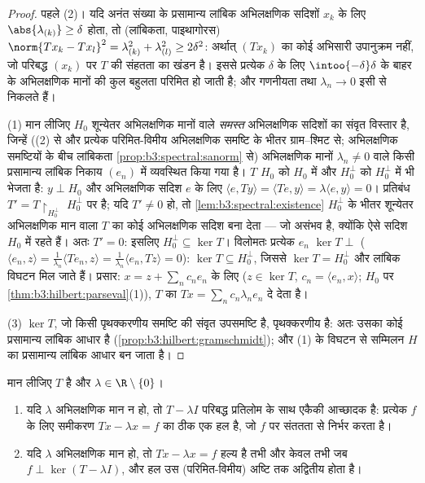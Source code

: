 \begin{proof}
पहले (2)। यदि अनंत संख्या के प्रसामान्य लांबिक अभिलक्षणिक सदिशों
$x_k$ के लिए $\abs{\lambda_{(k)}} \geq \delta$ होता, तो (लांबिकता, पाइथागोरस) $\norm{Tx_k - Tx_l}^2 =
\lambda_{(k)}^2 + \lambda_{(l)}^2 \geq 2\delta^2$: अर्थात्
$(Tx_k)$ का कोई अभिसारी उपानुक्रम नहीं, जो परिबद्ध $(x_k)$ पर $T$ की
संहतता का खंडन है। इससे प्रत्येक $\delta$ के लिए $\intoo{-\delta}\delta$ के बाहर के
अभिलक्षणिक मानों की कुल बहुलता परिमित हो जाती है; और गणनीयता तथा
$\lambda_n \to 0$ इसी से निकलते हैं।

(1) मान लीजिए $H_0$ शून्येतर अभिलक्षणिक मानों वाले \emph{समस्त}
अभिलक्षणिक सदिशों का संवृत विस्तार है, जिन्हें ((2) से और प्रत्येक
परिमित-विमीय अभिलक्षणिक समष्टि के भीतर ग्राम--श्मिट से; अभिलक्षणिक
समष्टियों के बीच लांबिकता \cref{prop:b3:spectral:sanorm} से) अभिलक्षणिक मानों $\lambda_n \neq 0$ वाले
किसी प्रसामान्य लांबिक निकाय $(e_n)$ में व्यवस्थित किया गया है।
$T$ $H_0$ को $H_0$ में और $H_0^\perp$ को $H_0^\perp$ में भी भेजता है: $y
\perp H_0$
और अभिलक्षणिक सदिश $e$ के लिए $\langle e, Ty\rangle =
\langle Te, y\rangle = \lambda\langle e, y\rangle = 0$। प्रतिबंध $T' = T\restriction_{H_0^\perp}$  $H_0^\perp$ पर   है; यदि $T' \neq
0$ हो, तो \cref{lem:b3:spectral:existence} $H_0^\perp$
के भीतर शून्येतर अभिलक्षणिक मान वाला $T$ का कोई अभिलक्षणिक सदिश
बना देता --- जो असंभव है, क्योंकि ऐसे सदिश $H_0$ में रहते हैं। अतः
$T' = 0$: इसलिए $H_0^\perp \subseteq \ker T$। विलोमतः प्रत्येक $e_n$ $\ker T \perp$ ($\langle e_n, z\rangle = \frac1{\lambda_n}\langle
Te_n, z\rangle = \frac1{\lambda_n}\langle e_n, Tz\rangle =
0$): $\ker T \subseteq H_0^\perp$,
जिससे $\ker T =
H_0^\perp$ और लांबिक विघटन मिल जाते हैं। प्रसार: $x = z + \sum_nc_ne_n$ के लिए
($z \in \ker T$, $c_n = \langle
e_n, x\rangle$; $H_0$ पर \cref{thm:b3:hilbert:parseval}(1)), $T$ का  $Tx = \sum_nc_n\lambda_ne_n$ दे देता
है।

(3) $\ker T$, जो किसी पृथक्करणीय समष्टि की संवृत उपसमष्टि है,
पृथक्करणीय है: अतः उसका कोई प्रसामान्य लांबिक आधार है (\cref{prop:b3:hilbert:gramschmidt}); और
(1) के विघटन से सम्मिलन $H$ का प्रसामान्य लांबिक आधार बन जाता है।
\end{proof}

\begin{theorem}[फ्रेडहोम विकल्प]
\label{thm:b3:spectral:fredholm}
मान लीजिए $T$   है और $\lambda \in \R\setminus
\{0\}$।
\begin{enumerate}
  \item यदि $\lambda$ अभिलक्षणिक मान न हो, तो $T - \lambda I$ परिबद्ध प्रतिलोम
        के साथ एकैकी आच्छादक है: प्रत्येक $f$ के लिए समीकरण
        $Tx - \lambda x = f$ का ठीक एक हल है, जो $f$ पर संततता से निर्भर करता
        है।
  \item यदि $\lambda$ अभिलक्षणिक मान हो, तो $Tx - \lambda x = f$ हल्य है तभी और केवल
        तभी जब $f \perp \ker(T - \lambda I)$, और हल उस (परिमित-विमीय) अष्टि तक अद्वितीय
        होता है।
\end{enumerate}
\end{theorem}

